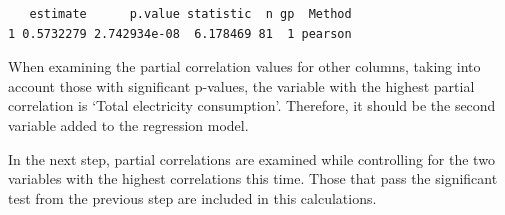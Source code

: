 \documentclass[
  11pt,
  a4paper,
  DIV=11,
  numbers=noendperiod]{scrartcl}
\newenvironment{Shaded}{\begin{snugshade}}{\end{snugshade}}
\newcommand{\AttributeTok}[1]{\textcolor[rgb]{0.40,0.45,0.13}{#1}}
\newcommand{\DecValTok}[1]{\textcolor[rgb]{0.68,0.00,0.00}{#1}}
\newcommand{\FunctionTok}[1]{\textcolor[rgb]{0.28,0.35,0.67}{#1}}
\newcommand{\NormalTok}[1]{\textcolor[rgb]{0.00,0.23,0.31}{#1}}
\newcommand{\OtherTok}[1]{\textcolor[rgb]{0.00,0.23,0.31}{#1}}
\newcommand{\SpecialCharTok}[1]{\textcolor[rgb]{0.37,0.37,0.37}{#1}}
\newcommand{\StringTok}[1]{\textcolor[rgb]{0.13,0.47,0.30}{#1}}
\begin{document}
\begin{Shaded}
\end{Shaded}

\begin{verbatim}
   estimate      p.value statistic  n gp  Method
1 0.5732279 2.742934e-08  6.178469 81  1 pearson
\end{verbatim}

When examining the partial correlation values for other columns, taking
into account those with significant p-values, {the variable with the
highest partial correlation is `Total electricity consumption'}.
Therefore, it should be the second variable added to the regression
model.

In the next step, partial correlations are examined while controlling
for the two variables with the highest correlations this time. Those
that pass the significant test from the previous step are included in
this calculations.

\begin{Shaded}
\end{Shaded}
\end{document}
